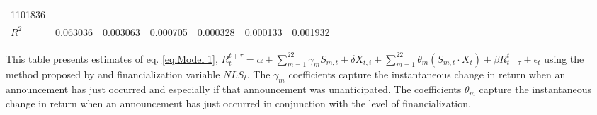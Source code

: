 \begin{sidewaystable}
{\begin{tabular}{@{}lllllllllllll@{}}
\multicolumn{2}{c}{ 1101836 }                                                 \\ \textbf{$R^2$}             &\multicolumn{2}{c}{ 0.063036 }                                                 & \multicolumn{2}{c}{ 0.003063 }                                                 & \multicolumn{2}{c}{ 0.000705 }                                                 & \multicolumn{2}{c}{ 0.000328 }                                                 & \multicolumn{2}{c}{ 0.000133 }                                                   & \multicolumn{2}{c}{ 0.001932 }                                                 \\ \bottomrule 
\end{tabular}
}
\begin{tablenotes}\item 
    \singlespacing
    \footnotesize
    This table presents estimates of eq. \ref{eq:Model 1}, $R_{t}^{t+\tau}=\alpha+\sum_{m=1}^{22} \gamma_m S_{m,t}+ \delta X_{t,i} + \sum_{m=1}^{22} \theta_m (S_{m,t} \cdot X_t)+\beta R_{t-\tau}^{t}+\epsilon_{t}$ using the method proposed by \citet{andersen2007real} and financialization variable $NLS_t$. The $\gamma_m$ coefficients capture the instantaneous change in return when an announcement has just occurred and especially if that announcement was unanticipated. The coefficients $\theta_m$ capture the instantaneous change in return when an announcement has just occurred in conjunction with the level of financialization.
\end{tablenotes}
\end{sidewaystable}

